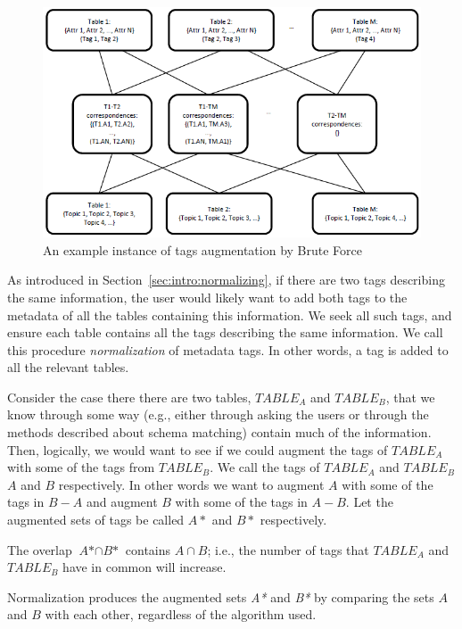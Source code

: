\begin{figure}
    \centering
    \includegraphics[width=5in]{figures/an-example-instance-brute-force.png}
    \caption{An example instance of tags augmentation by Brute Force}
    \label{fig:an-example-instance-brute-force}
\end{figure}

As introduced in Section~\ref{sec:intro:normalizing}, if there are two tags describing the same information, the user 
would likely want to add both tags to the metadata of all the tables containing this information. We seek all such tags, and ensure each table contains all the tags describing
the same information. We call this procedure \textit{normalization} of metadata tags. In
other words, a tag is added to all the relevant tables.


Consider the case there there are two tables, $TABLE_A$ and $TABLE_B$, that we know through some way (e.g., either through asking the users or through the methods described about schema matching) contain much of the information. Then, logically, we would want to see if we could augment the tags of $TABLE_A$ with some of the tags from $TABLE_B$. We call the tags of $TABLE_A$ and $TABLE_B$ $A$ and $B$ respectively. In other words we want to augment $A$ with some of the tags in $B-A$ and augment $B$ with some of the tags in $A-B$. Let the augmented sets of tags be called $A*$ and $B*$ respectively.

The overlap $\textit{A*}\cap\textit{B*}$ contains $A\cap B$; i.e., the number of tags that $TABLE_A$ and $TABLE_B$ have in common will increase. 

Normalization produces the augmented sets \textit{A*} and \textit{B*} by comparing the sets $A$ and $B$ with each other, regardless of the algorithm used. 


